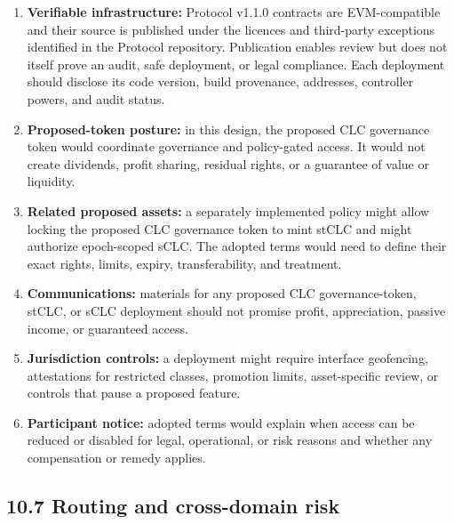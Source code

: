\documentclass[11pt]{article}
\begin{document}
\begin{enumerate}[leftmargin=*]
\item \textbf{Verifiable infrastructure:} Protocol v1.1.0 contracts are EVM-compatible and their source is published under the licences and third-party exceptions identified in the Protocol repository. Publication enables review but does not itself prove an audit, safe deployment, or legal compliance. Each deployment should disclose its code version, build provenance, addresses, controller powers, and audit status.
\item \textbf{Proposed-token posture:} in this design, the proposed CLC governance token would coordinate governance and policy-gated access. It would not create dividends, profit sharing, residual rights, or a guarantee of value or liquidity.
\item \textbf{Related proposed assets:} a separately implemented policy might allow locking the proposed CLC governance token to mint stCLC and might authorize epoch-scoped sCLC. The adopted terms would need to define their exact rights, limits, expiry, transferability, and treatment.
\item \textbf{Communications:} materials for any proposed CLC governance-token, stCLC, or sCLC deployment should not promise profit, appreciation, passive income, or guaranteed access.
\item \textbf{Jurisdiction controls:} a deployment might require interface geofencing, attestations for restricted classes, promotion limits, asset-specific review, or controls that pause a proposed feature.
\item \textbf{Participant notice:} adopted terms would explain when access can be reduced or disabled for legal, operational, or risk reasons and whether any compensation or remedy applies.
\end{enumerate}
\subsection*{10.7 Routing and cross-domain risk}
\end{document}
